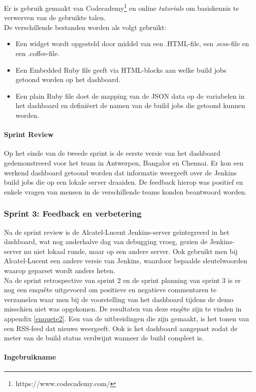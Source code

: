 \documentclass[10pt,a4paper]{article}
\begin{document}
Er is gebruik gemaakt van Codecademy\footnote{https://www.codecademy.com/} en online \textit{tutorials} om basiskennis te verwerven van de gebruikte talen.\\
De verschillende bestanden worden als volgt gebruikt:
\begin{itemize}
\item Een widget wordt opgesteld door middel van een .HTML-file, een .scss-file en een .coffee-file.
\item Een Embedded Ruby file geeft via HTML-blocks aan welke build jobs getoond worden op het dashboard.
\item Een plain Ruby file doet de mapping van de JSON data op de variabelen in het dashboard en defini\"eert de namen van de build jobs die getoond kunnen worden.
\end{itemize}
\paragraph{Sprint Review} Op het einde van de tweede sprint is de eerste versie van het dashboard gedemonstreerd voor het team in Antwerpen, Bangalor en Chennai. Er kon een werkend dashboard getoond worden dat informatie weergeeft over de Jenkins build jobs die op een lokale server draaiden. De feedback hierop was positief en enkele vragen van mensen in de verschillende teams konden beantwoord worden. 
\subsubsection{Sprint 3: Feedback en verbetering}
\label{sprint3}
Na de sprint review is de Alcatel-Lucent Jenkins-server ge\"integreerd in het dashboard, wat nog anderhalve dag van debugging vroeg, gezien de Jenkins-server nu niet lokaal runde, maar op een andere server. Ook gebruikt men bij Alcatel-Lucent een andere versie van Jenkins, waardoor bepaalde sleutelwoorden waarop geparset wordt anders heten.\\
Na de sprint retrospective van sprint 2 en de sprint planning van sprint 3 is er nog een enqu\^ete uitgevoerd om positieve en negatieve commentaren te verzamelen waar men bij de voorstelling van het dashboard tijdens de demo misschien niet was opgekomen. De resultaten van deze enq\^ete zijn te vinden in appendix \ref{enquete2}.
Een van de uitbreidingen die zijn gemaakt, is het tonen van een RSS-feed dat nieuws weergeeft. Ook is het dashboard aangepast zodat de meter van de build status verdwijnt wanneer de build compleet is.
\paragraph{Ingebruikname} 
\end{document}
